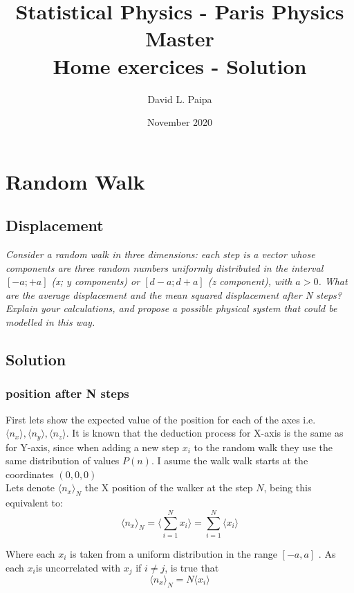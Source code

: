 \documentclass{article}
\title{Statistical Physics - Paris Physics Master\\
    Home exercices - Solution}
\author{David L. Paipa}
\date{November 2020}
\begin{document}
\maketitle


\section{Random Walk}

\subsection{Displacement}
\textit{
Consider a random walk in three dimensions: each step is a vector whose components are three random numbers uniformly distributed in the interval $[-a;+a]$ (x; y components) or $[d -a; d + a]$ (z component), with $a > 0$. What are the average displacement and the mean squared displacement after N steps? Explain your calculations, and propose a possible physical system that could be modelled in this way.}


\subsection*{Solution}

\subsubsection*{position after N steps}
First lets show the expected value of the position for each of the axes i.e. $\langle n_x\rangle ,\langle n_y \rangle,\langle n_z\rangle$. It is known that the deduction process for X-axis is the same as for Y-axis, since when adding a new step $x_i$ to the random walk they use the same distribution of values $P(n)$. I asume the walk walk starts at the coordinates $(0, 0, 0)$\\

Lets denote $\langle n_x \rangle_N$ the X position of the walker at the step $N$, being this equivalent to:
\begin{equation}
\langle n_x \rangle_N = \langle \sum_{i=1}^N x_i \rangle = \sum_{i=1}^N \langle  x_i \rangle
\end{equation}

Where each $x_i$ is taken from a uniform distribution in the range $[-a,a]$ . As each $x_i$is uncorrelated with $x_j$ if $i \neq j$, is true that
\begin{equation}
    \langle n_x \rangle_N = N \langle x_i \rangle
\end{equation}
\end{document}
